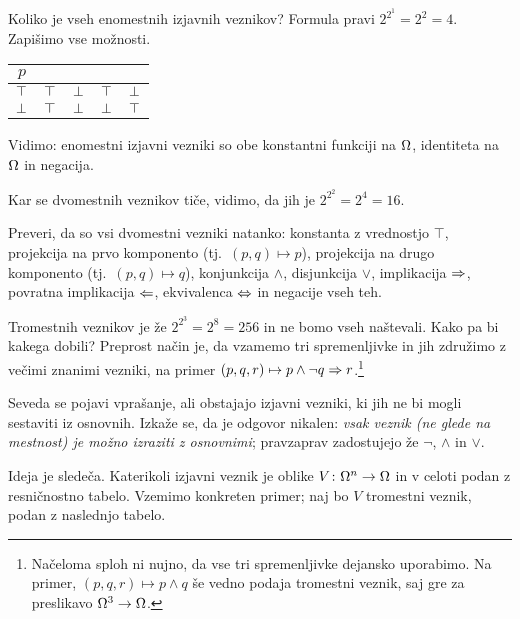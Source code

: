                 Koliko je vseh enomestnih izjavnih veznikov? Formula pravi $2^{2^1} = 2^2 = 4$. Zapišimo vse možnosti.

                \begin{center}
                        \begin{tabular}{c|cccc}
                                $p$ &&&& \\
                                \hline
                                $\top$ & $\top$ & $\bot$ & $\top$ & $\bot$ \\
                                $\bot$ & $\top$ & $\bot$ & $\bot$ & $\top$
                        \end{tabular}
                \end{center}

                Vidimo: enomestni izjavni vezniki so obe konstantni funkciji na $\Omega$, identiteta na $\Omega$ in negacija.

                Kar se dvomestnih veznikov tiče, vidimo, da jih je $2^{2^2} = 2^4 = 16$.

                \begin{vaja}
                        Preveri, da so vsi dvomestni vezniki natanko: konstanta z vrednostjo $\top$, projekcija na prvo komponento (tj.~$(p, q) \mapsto p$), projekcija na drugo komponento (tj.~$(p, q) \mapsto q$), konjunkcija $\land$, disjunkcija $\lor$, implikacija $\Rightarrow$, povratna implikacija $\Leftarrow$, ekvivalenca $\Leftrightarrow$ in negacije vseh teh.
                \end{vaja}

                Tromestnih veznikov je že $2^{2^3} = 2^8 = 256$ in ne bomo vseh naštevali. Kako pa bi kakega dobili? Preprost način je, da vzamemo tri spremenljivke in jih združimo z večimi znanimi vezniki, na primer $(p, q, r) \mapsto p \land \lnot{q} \Rightarrow r$.\footnote{Načeloma sploh ni nujno, da vse tri spremenljivke dejansko uporabimo. Na primer, $(p, q, r) \mapsto p \land q$ še vedno podaja tromestni veznik, saj gre za preslikavo $\Omega^3 \to \Omega$.}

                Seveda se pojavi vprašanje, ali obstajajo izjavni vezniki, ki jih ne bi mogli sestaviti iz osnovnih. Izkaže se, da je odgovor nikalen: \emph{vsak veznik (ne glede na mestnost) je možno izraziti z osnovnimi}; pravzaprav zadostujejo že $\lnot$, $\land$ in $\lor$.

                Ideja je sledeča. Katerikoli izjavni veznik je oblike $V\colon \Omega^n \to \Omega$ in v celoti podan z resničnostno tabelo. Vzemimo konkreten primer; naj bo $V$ tromestni veznik, podan z naslednjo tabelo.

